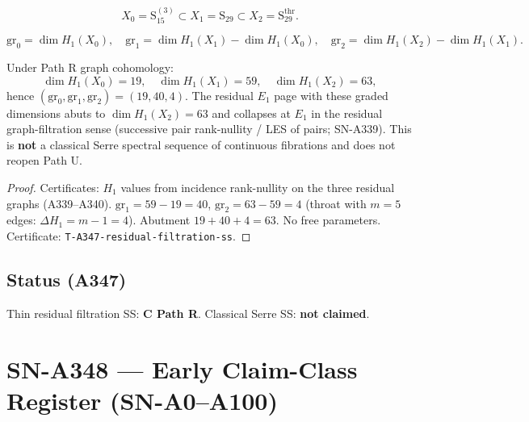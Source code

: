 \begin{definition}
\label{def:A347-F}
\begin{equation}
X_0=\mathrm{S}_{15}^{(3)}\subset X_1=\mathrm{S}_{29}\subset X_2=\mathrm{S}_{29}^{\mathrm{thr}}.
\end{equation}
\end{definition}

\begin{definition}
\label{def:A347-gr}
\begin{equation}
\mathrm{gr}_0=\dim H_1(X_0),\quad
\mathrm{gr}_1=\dim H_1(X_1)-\dim H_1(X_0),\quad
\mathrm{gr}_2=\dim H_1(X_2)-\dim H_1(X_1).
\end{equation}
\end{definition}

\begin{theorem}
\label{thm:A347}
Under Path R graph cohomology:
\begin{equation}
\dim H_1(X_0)=19,\quad
\dim H_1(X_1)=59,\quad
\dim H_1(X_2)=63,
\end{equation}
hence $(\mathrm{gr}_0,\mathrm{gr}_1,\mathrm{gr}_2)=(19,40,4)$.
The residual $E_1$ page with these graded dimensions abuts to $\dim H_1(X_2)=63$ and collapses at $E_1$ in the residual graph-filtration sense (successive pair rank-nullity / LES of pairs; SN-A339).
This is \textbf{not} a classical Serre spectral sequence of continuous fibrations and does not reopen Path U.
\end{theorem}

\begin{proof}
Certificates: $H_1$ values from incidence rank-nullity on the three residual graphs (A339--A340).
$\mathrm{gr}_1=59-19=40$, $\mathrm{gr}_2=63-59=4$ (throat with $m=5$ edges: $\Delta H_1=m-1=4$).
Abutment $19+40+4=63$. No free parameters. Certificate: \texttt{T-A347-residual-filtration-ss}.
\end{proof}

\subsection*{Status (A347)}
Thin residual filtration SS: \textbf{C Path R}. Classical Serre SS: \textbf{not claimed}.

\section{SN-A348 --- Early Claim-Class Register (SN-A0--A100)}
\label{sec:SN-A348}

